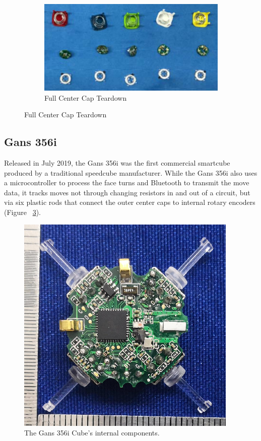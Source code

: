 \begin{figure}[h]
\begin{subfigure}{0.25\textwidth}
    \end{subfigure}%
    \begin{subfigure}{0.50\textwidth}
        \centering
        \caption{Full Center Cap Teardown}
        \label{fig:gocube-centers}
        \includegraphics[width=.90\linewidth]{Figures/3 State of the Art/gocube-centers.png}
    \end{subfigure}%
\end{figure}

\subsection{Gans 356i}

Released in July 2019, the Gans 356i was the first commercial smartcube
produced by a traditional speedcube manufacturer.
\cite{gans356i-thecubicle} While the Gans 356i also uses a
microcontroller to process the face turns and Bluetooth to transmit the
move data, it tracks moves not through changing resistors in and out of
a circuit, but via six plastic rods that connect the outer center caps
to internal rotary encoders (Figure ~\ref{fig:gans356i-core}).

\begin{figure}[h]
    \centering
    \caption[Gans 356i Teardown]{The Gans 356i Cube's internal components. \cite{gans-356i-internals}}
    \label{fig:gans356i-core}
    \includegraphics{Figures/3 State of the Art/gans356i-core.png}
\end{figure}


